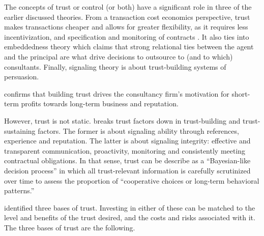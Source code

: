 \documentclass[12pt]{article}
\begin{document}
The concepts of trust or control (or both) have a significant role in
three of the earlier discussed theories. From a transaction cost
economics perspective, trust makes transactions cheaper and allows for
greater flexibility, as it requires less incentivization, and
specification and monitoring of contracts \citep[ 989]{nooteboom1996}.
It also ties into embeddedness theory which claims that strong
relational ties between the agent and the principal are what drive
decisions to outsource to (and to which) consultants. Finally, signaling
theory is about trust-building systems of persuasion.

\citet[265]{liberatore2010} confirms that building trust drives the
consultancy firm's motivation for short-term profits towards long-term
business and reputation.

However, trust is not static. \citet[193-194]{kirilov2012} breaks trust
factors down in trust-building and trust-sustaining factors. The former
is about signaling ability through references, experience and
reputation. The latter is about signaling integrity: effective and
transparent communication, proactivity, monitoring and consistently
meeting contractual obligations. In that sense, trust can be describe as
a ``Bayesian-like decision process'' in which all trust-relevant
information is carefully scrutinized over time to assess the proportion
of ``cooperative choices or long-term behavioral patterns.'' \citep[
995]{lewicki2006}

\citet[366-374]{shapiro1992} identified three bases of trust. Investing
in either of these can be matched to the level and benefits of the trust
desired, and the costs and risks associated with it. The three bases of
trust are the following.
\end{document}

